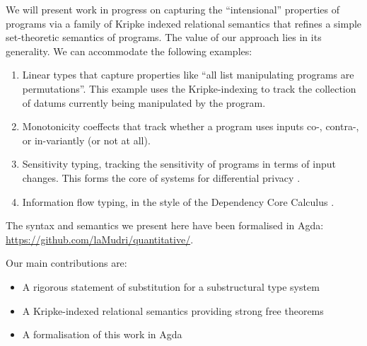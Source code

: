 We will present work in progress on capturing the ``intensional''
properties of programs via a family of Kripke indexed relational
semantics that refines a simple set-theoretic semantics of
programs. The value of our approach lies in its generality. We can
accommodate the following examples:
\begin{enumerate}
\item Linear types that capture properties like ``all list
  manipulating programs are permutations''. This example uses the
  Kripke-indexing to track the collection of datums currently being
  manipulated by the program.
\item Monotonicity coeffects that track whether a program uses inputs
  co-, contra-, or in-variantly (or not at all).
\item Sensitivity typing, tracking the sensitivity of programs in
  terms of input changes. This forms the core of systems for
  differential privacy \cite{reed10distance}.
\item Information flow typing, in the style of the Dependency Core
  Calculus \cite{abadi99core}.
\end{enumerate}

The syntax and semantics we present here have been formalised in Agda:
\url{https://github.com/laMudri/quantitative/}.

Our main contributions are:

\begin{itemize}
\item A rigorous statement of substitution for a substructural type system
\item A Kripke-indexed relational semantics providing strong free theorems
\item A formalisation of this work in Agda
\end{itemize}